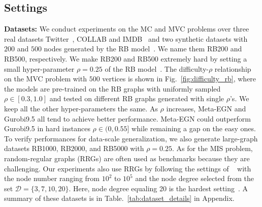 



\vspace{-0.1cm}
\subsection{Settings}\label{sec:settings}
\vspace{-0.1cm}

\textbf{Datasets:} We conduct experiments on the MC and MVC problems over three real datasets Twitter~\citep{leskovec2014snap}, COLLAB and IMDB~\citep{yanardag2015deep} and two synthetic datasets with $200$ and $500$ nodes generated by the RB model~\citep{xu2007benchmarks}. We name them RB200 and RB500, respectively. We make RB200 and RB500 extremely hard by setting a small hyper-parameter $\rho=0.25$ of the RB model~\citep{xu2007benchmarks}. The difficulty-$\rho$ relationship on the MVC problem with $500$ vertices is shown in Fig.~\ref{fig:difficulty_rb}, where the models are pre-trained on the RB graphs with uniformly sampled $\rho \in [0.3,1.0]$ and tested on different RB graphs generated with single $\rho$'s. We keep all the other hyper-parameters the same. As $\rho$ increases, Meta-EGN and Gurobi9.5 all tend to achieve better performance. Meta-EGN could outperform Gurobi9.5 in hard instances $\rho \in (0,0.55]$ while remaining a gap on the easy ones.
To verify performances for data-scale generalization, we also generate large-graph datasets RB1000, RB2000, and RB5000 with $\rho=0.25$. As for the MIS problem, random-regular graphs (RRGs) are often used as benchmarks because they are challenging. Our experiments also use RRGs by following the settings of ~\citep{schuetz2022combinatorial} with the node number ranging from $10^2$ to $10^5$ and the node degree selected from the set $\mathcal{D}=\{3,7,10,20\}$. Here, node degree equaling 20 is the hardest setting~\citep{angelini2022cracking}. A summary of these datasets is in Table.~\ref{tab:dataset_details} in Appendix.

